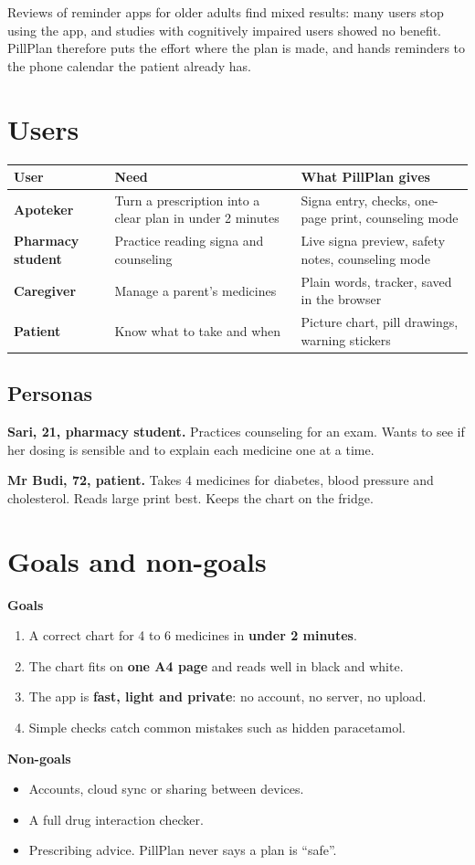 \documentclass[11pt]{article}
\begin{document}
Reviews of reminder apps for older adults find mixed results: many users stop using the app, and studies with cognitively impaired users showed no benefit. PillPlan therefore puts the effort where the plan is made, and hands reminders to the phone calendar the patient already has.

\section{Users}
\begin{tabularx}{\linewidth}{@{}>{\bfseries}p{30mm}X X@{}}
\toprule
User & Need & What PillPlan gives \\
\midrule
Apoteker & Turn a prescription into a clear plan in under 2 minutes & Signa entry, checks, one-page print, counseling mode \\
Pharmacy student & Practice reading signa and counseling & Live signa preview, safety notes, counseling mode \\
Caregiver & Manage a parent's medicines & Plain words, tracker, saved in the browser \\
Patient & Know what to take and when & Picture chart, pill drawings, warning stickers \\
\bottomrule
\end{tabularx}

\subsection{Personas}
\begin{note}[stickerblue]
\textbf{Sari, 21, pharmacy student.} Practices counseling for an exam. Wants to see if her dosing is sensible and to explain each medicine one at a time.
\end{note}
\begin{note}[stickerblue]
\textbf{Mr Budi, 72, patient.} Takes 4 medicines for diabetes, blood pressure and cholesterol. Reads large print best. Keeps the chart on the fridge.
\end{note}

\section{Goals and non-goals}
\textbf{Goals}
\begin{enumerate}
  \item A correct chart for 4 to 6 medicines in \textbf{under 2 minutes}.
  \item The chart fits on \textbf{one A4 page} and reads well in black and white.
  \item The app is \textbf{fast, light and private}: no account, no server, no upload.
  \item Simple checks catch common mistakes such as hidden paracetamol.
\end{enumerate}
\textbf{Non-goals}
\begin{itemize}
  \item Accounts, cloud sync or sharing between devices.
  \item A full drug interaction checker.
  \item Prescribing advice. PillPlan never says a plan is ``safe''.
\end{itemize}
\end{document}
